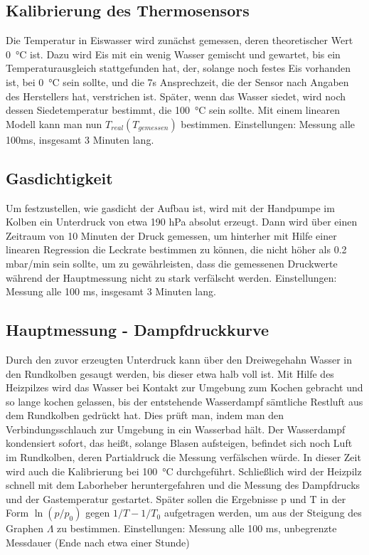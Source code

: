 \documentclass[]{article}
\begin{document}
\subsection {Kalibrierung des Thermosensors}  
Die Temperatur in Eiswasser wird zunächst gemessen, deren theoretischer Wert \SI{0}{\celsius} ist. Dazu wird Eis mit ein wenig Wasser gemischt und gewartet, bis ein Temperaturausgleich stattgefunden hat, der, solange noch festes Eis vorhanden ist, bei \SI{0}{\celsius} sein sollte, und die 7s Ansprechzeit, die der Sensor nach Angaben des Herstellers hat, verstrichen ist. Später, wenn das Wasser siedet, wird noch dessen Siedetemperatur bestimmt, die \SI{100}{\celsius} sein sollte. Mit einem linearen Modell kann man nun $T_{real}(T_{gemessen})$ bestimmen.
Einstellungen: Messung alle 100ms, insgesamt 3 Minuten lang.

\subsection{Gasdichtigkeit}
Um festzustellen, wie gasdicht der Aufbau ist, wird mit der Handpumpe im Kolben ein Unterdruck von etwa 190 hPa absolut erzeugt. Dann wird über einen Zeitraum von 10 Minuten der Druck gemessen, um hinterher mit Hilfe einer linearen Regression die Leckrate bestimmen zu können, die nicht höher als 0.2 mbar/min sein sollte, um zu gewährleisten, dass die gemessenen Druckwerte während der Hauptmessung nicht zu stark verfälscht werden. 
Einstellungen: Messung alle 100 ms, insgesamt 3 Minuten lang.


\subsection{Hauptmessung - Dampfdruckkurve}
Durch den zuvor erzeugten Unterdruck kann über den Dreiwegehahn Wasser in den Rundkolben gesaugt werden, bis dieser etwa halb voll ist. Mit Hilfe des Heizpilzes wird das Wasser bei Kontakt zur Umgebung zum Kochen gebracht und so lange kochen gelassen, bis der entstehende Wasserdampf sämtliche Restluft aus dem Rundkolben gedrückt hat. Dies prüft man, indem man den Verbindungsschlauch zur Umgebung in ein Wasserbad hält. Der Wasserdampf kondensiert sofort, das heißt, solange Blasen aufsteigen, befindet sich noch Luft im Rundkolben, deren Partialdruck die Messung verfälschen würde. In dieser Zeit wird auch die Kalibrierung bei \SI{100}{\celsius} durchgeführt. Schließlich wird der Heizpilz schnell mit dem Laborheber heruntergefahren und die Messung des Dampfdrucks und der Gastemperatur gestartet. Später sollen die Ergebnisse p und T in der Form $\ln(p/p_0)$ gegen $1/T-1/T_0$ aufgetragen werden, um aus der Steigung des Graphen $\Lambda$ zu bestimmen.
Einstellungen: Messung alle 100 ms, unbegrenzte Messdauer (Ende nach etwa einer Stunde)\\
\end{document}

